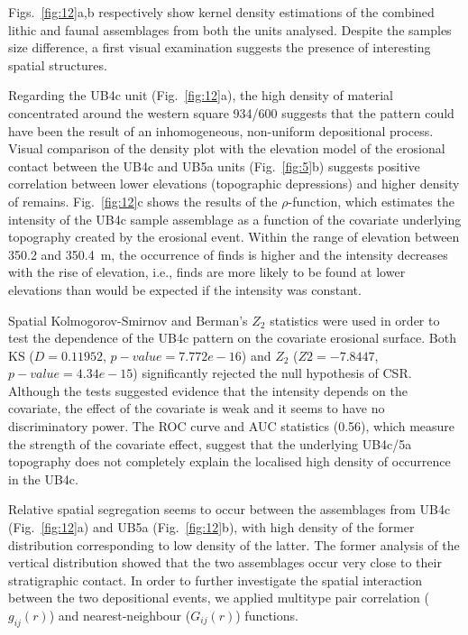 \documentclass[preprint,authoryear,times]{elsarticle} %
\begin{document}
Figs.~\ref{fig:12}a,b respectively show kernel density estimations of the combined lithic and faunal assemblages from both the units analysed. Despite the samples size difference, a first visual examination suggests the presence of interesting spatial structures.

Regarding the UB4c unit (Fig.~\ref{fig:12}a), the high density of material concentrated around the western square 934/600 suggests that the pattern could have been the result of an inhomogeneous, non-uniform depositional process. Visual comparison of the density plot with the elevation model of the erosional contact between the UB4c and UB5a units (Fig.~\ref{fig:5}b) suggests positive correlation between lower elevations (topographic depressions) and higher density of remains. Fig.~\ref{fig:12}c shows the results of the $\rho$-function, which estimates the intensity of the UB4c sample assemblage as a function of the covariate underlying topography created by the erosional event. Within the range of elevation between 350.2 and 350.4~m, the occurrence of finds is higher and the intensity decreases with the rise of elevation, i.e., finds are more likely to be found at lower elevations than would be expected if the intensity was constant.

Spatial Kolmogorov-Smirnov and Berman's $Z_2$ \citep{Berman1986} statistics were used in order to test the dependence of the UB4c pattern on the covariate erosional surface. Both KS ($D=0.11952$, $p-value=7.772e-16$) and $Z_2$ ($Z2=-7.8447$, $p-value=4.34e-15$) significantly rejected the null hypothesis of CSR. Although the tests suggested evidence that the intensity depends on the covariate, the effect of the covariate is weak and it seems to have no discriminatory power. The ROC curve and AUC statistics (0.56), which measure the strength of the covariate effect, suggest that the underlying UB4c/5a topography does not completely explain the localised high density of occurrence in the UB4c.

Relative spatial segregation seems to occur between the assemblages from UB4c (Fig.~\ref{fig:12}a) and UB5a (Fig.~\ref{fig:12}b), with high density of the former distribution corresponding to low density of the latter. The former analysis of the vertical distribution showed that the two assemblages occur very close to their stratigraphic contact. In order to further investigate the spatial interaction between the two depositional events, we applied multitype pair correlation ($g_{ij}(r)$) and nearest-neighbour ($G_{ij}(r)$) functions.
\end{document}
